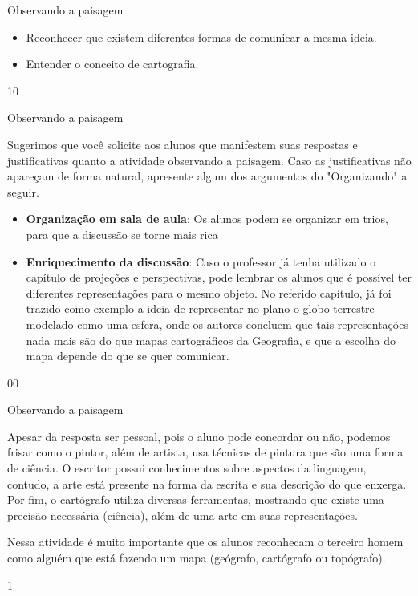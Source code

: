 \begin{objectives}{Observando a paisagem}
{
	\begin{itemize}
	\item Reconhecer que existem diferentes formas de comunicar a mesma ideia.
	\item Entender o conceito de cartografia.
	\end{itemize}
}{1}{0}
\end{objectives}
\vspace{-.5em}
\begin{sugestions}{Observando a paisagem}
{
	Sugerimos que você solicite aos alunos que manifestem suas respostas e justificativas quanto a atividade observando a paisagem. Caso as justificativas não apareçam de forma natural, apresente algum dos argumentos do "Organizando" a seguir.
	\begin{itemize}
	\item \textbf{Organização em sala de aula}: Os alunos podem se organizar em trios, para que a discussão se torne mais rica
	\item \textbf{Enriquecimento da discussão}: Caso o professor já tenha utilizado o capítulo de projeções e perspectivas, pode lembrar os alunos que é possível ter diferentes representações para o mesmo objeto. No referido capítulo, já foi trazido como exemplo a ideia de representar no plano o globo terrestre modelado como uma esfera, onde os autores concluem que tais representações nada mais são do que mapas cartográficos da Geografia, e que a escolha do mapa depende do que se quer comunicar.
	\end{itemize}
}{0}{0}
\end{sugestions}
\marginpar{\vspace{.5em}}
\begin{answer}{Observando a paisagem}
{
	Apesar da resposta ser pessoal, pois o aluno pode concordar ou não, podemos frisar como o pintor, além de artista, usa técnicas de pintura que são uma forma de ciência. O escritor possui conhecimentos sobre aspectos da linguagem, contudo, a arte está presente na forma da escrita e sua descrição do que enxerga. Por fim, o cartógrafo utiliza diversas ferramentas, mostrando que existe uma precisão necessária (ciência), além de uma arte em suas representações.

	Nessa atividade é muito importante que os alunos reconhecam o terceiro homem como alguém que está fazendo um mapa (geógrafo, cartógrafo ou topógrafo).
}{1}
\end{answer}

